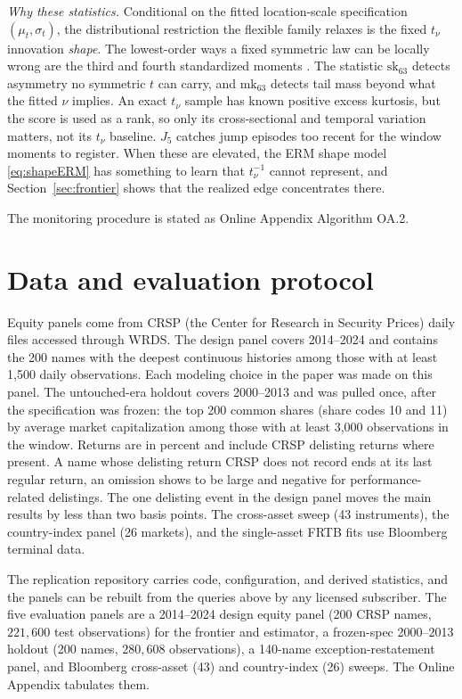 \documentclass[11pt]{article}
\theoremstyle{remark}
\begin{document}
\emph{Why these statistics.} Conditional on the fitted location-scale
specification $(\mu_t,\sigma_t)$, the distributional restriction the
flexible family relaxes is the fixed $t_\nu$ innovation \emph{shape}.
The lowest-order ways a fixed symmetric law can be locally wrong are the third and fourth standardized moments \citep{bollerslev1987, hansen1994ARCD}. The statistic $\mathrm{sk}_{63}$ detects asymmetry no symmetric $t$ can carry, and $\mathrm{mk}_{63}$ detects tail mass beyond what the fitted $\nu$ implies. An exact $t_\nu$ sample has known positive excess kurtosis, but the score is used as a rank, so only its cross-sectional and temporal variation matters, not its $t_\nu$ baseline. $J_5$ catches
jump episodes too recent for the window moments to register. When these
are elevated, the ERM shape model \eqref{eq:shapeERM} has something to
learn that $t_\nu^{-1}$ cannot represent, and Section~\ref{sec:frontier} shows that the realized edge concentrates there.

\noindent The monitoring procedure is stated as Online Appendix Algorithm OA.2.

\section{Data and evaluation protocol}\label{sec:protocol}

Equity panels come from CRSP (the Center for Research in Security Prices) daily files accessed through WRDS. The
design panel covers 2014--2024 and contains the 200 names with the
deepest continuous histories among those with at least 1{,}500 daily
observations. Each modeling choice in the paper was made on this
panel. The untouched-era holdout covers 2000--2013 and was pulled once,
after the specification was frozen: the top 200 common shares (share
codes 10 and 11) by average market capitalization among those with at
least 3{,}000 observations in the window. Returns are in percent and include
CRSP delisting returns where present. A name whose delisting return CRSP does not record ends at its last regular return, an omission \citet{shumway1997} shows to be large and negative for performance-related delistings. The one delisting event in the
design panel moves the main results by less than two basis points. The
cross-asset sweep (43 instruments), the country-index panel (26
markets), and the single-asset FRTB fits use Bloomberg terminal data.

The replication repository carries code, configuration, and derived
statistics, and the panels can be rebuilt from the queries above by any
licensed subscriber. The five evaluation panels are a 2014--2024 design equity panel (200 CRSP
names, $221{,}600$ test observations) for the frontier and estimator, a
frozen-spec 2000--2013 holdout (200 names, $280{,}608$ observations), a
140-name exception-restatement panel, and Bloomberg cross-asset (43) and
country-index (26) sweeps. The Online Appendix tabulates them.
\end{document}
